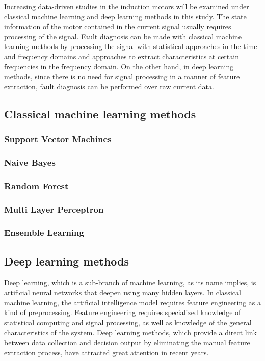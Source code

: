 Increasing data-driven studies in the induction motors will be examined under classical machine learning and deep learning methods in this study. The state information of the motor contained in the current signal usually requires processing of the signal. Fault diagnosis can be made with classical machine learning methods by processing the signal with statistical approaches in the time and frequency domains and approaches to extract characteristics at certain frequencies in the frequency domain. On the other hand, in deep learning methods, since there is no need for signal processing in a manner of feature extraction, fault diagnosis can be performed over raw current data.



\subsection{Classical machine learning methods}

\subsubsection{Support Vector Machines}

\subsubsection{Naive Bayes}

\subsubsection{Random Forest}

\subsubsection{Multi Layer Perceptron}

\subsubsection{Ensemble Learning}

\subsection{Deep learning methods}	

Deep learning, which is a sub-branch of machine learning, as its name implies, is artificial neural networks that deepen using many hidden layers. In classical machine learning, the artificial intelligence model requires feature engineering as a kind of preprocessing. Feature engineering requires specialized knowledge of statistical computing and signal processing, as well as knowledge of the general characteristics of the system. Deep learning methods, which provide a direct link between data collection and decision output by eliminating the manual feature extraction process, have attracted great attention in recent years.

